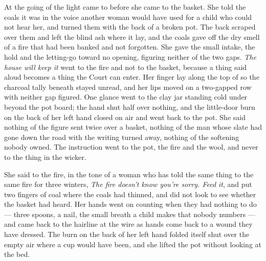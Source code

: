 \scenebreak

At the going of the light  came to  before she came to the basket. She told the coals it was  in the voice another woman would have used for a child who could not hear her, and turned them with the back of a broken pot. The back scraped over them and left the blind ash where it lay, and the coals gave off the dry smell of a fire that had been banked and not forgotten. She gave the small intake, the hold and the letting-go toward no opening, figuring neither of the two gaps. \emph{The house will keep it} went to the fire and not to the basket, because a thing said aloud becomes a thing the Court can enter. Her finger lay along the top of  so the charcoal tally beneath stayed unread, and her lips moved on a two-gapped row with neither gap figured. One glance went to the clay jar standing cold under  beyond the pot board; the hand shut half over nothing, and the little-door burn on the back of her left hand closed on air and went back to the pot. She said nothing of the figure sent twice over a basket, nothing of the man whose slate had gone down the road with the writing turned away, nothing of the softening nobody owned. The instruction went to the pot, the fire and the wool, and never to the thing in the wicker.

She said to the fire, in the tone of a woman who has told the same thing to the same fire for three winters, \emph{The fire doesn't know you're sorry. Feed it}, and put two fingers of coal where the coals had thinned, and did not look to see whether the basket had heard. Her hands went on counting when they had nothing to do --- three spoons, a nail, the small breath a child makes that nobody numbers --- and came back to the hairline at the wire as hands come back to a wound they have dressed. The burn on the back of her left hand folded itself shut over the empty air where a cup would have been, and she lifted the pot without looking at the bed.

